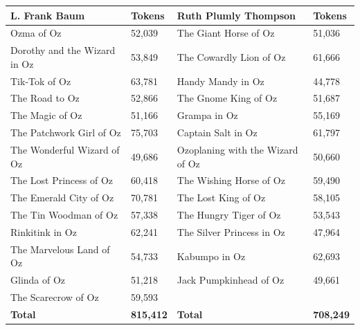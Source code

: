 \documentclass{llmxive}
\begin{document}
\begin{center}
\begin{tabular}{@{}ll|ll@{}}
\toprule
\textbf{L. Frank Baum} & \textbf{Tokens} & \textbf{Ruth Plumly Thompson} & \textbf{Tokens} \\
\midrule
Ozma of Oz & 52,039 & The Giant Horse of Oz & 51,036 \\
Dorothy and the Wizard in Oz & 53,849 & The Cowardly Lion of Oz & 61,666 \\
Tik-Tok of Oz & 63,781 & Handy Mandy in Oz & 44,778 \\
The Road to Oz & 52,866 & The Gnome King of Oz & 51,687 \\
The Magic of Oz & 51,166 & Grampa in Oz & 55,169 \\
The Patchwork Girl of Oz & 75,703 & Captain Salt in Oz & 61,797 \\
The Wonderful Wizard of Oz & 49,686 & Ozoplaning with the Wizard of Oz & 50,660 \\
The Lost Princess of Oz & 60,418 & The Wishing Horse of Oz & 59,490 \\
The Emerald City of Oz & 70,781 & The Lost King of Oz & 58,105 \\
The Tin Woodman of Oz & 57,338 & The Hungry Tiger of Oz & 53,543 \\
Rinkitink in Oz & 62,241 & The Silver Princess in Oz & 47,964 \\
The Marvelous Land of Oz & 54,733 & Kabumpo in Oz & 62,693 \\
Glinda of Oz & 51,218 & Jack Pumpkinhead of Oz & 49,661 \\
The Scarecrow of Oz & 59,593 & & \\
\textbf{Total} & \textbf{815,412} & \textbf{Total} & \textbf{708,249} \\
\bottomrule
\end{tabular}

\end{center}
\end{document}
